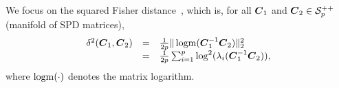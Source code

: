 \documentclass{article}
\theoremstyle{plain}
\theoremstyle{definition}
\theoremstyle{remark}
\begin{document}
We focus on the squared Fisher distance~\cite{skovgaard1984riemannian}, which is, for all $\boldsymbol{C}_1$ and $\boldsymbol{C}_2\in\mathcal{S}^{++}_{p}$ (manifold of SPD matrices),
\begin{equation}
    \begin{array}{rcl}
        \delta^2(\boldsymbol{C}_1,\boldsymbol{C}_2) & = & \frac1{2p}\| \operatorname{logm}(\boldsymbol{C}_1^{-1}\boldsymbol{C}_2) \|_2^2  \\
         & = & \frac1{2p}\sum_{i=1}^{p} \log^2(\lambda_i(\boldsymbol{C}_1^{-1}\boldsymbol{C}_2)),
    \end{array}
\label{eq:Fisher_dist}
\end{equation}
where $\operatorname{logm}(\cdot)$ denotes the matrix logarithm.
\end{document}
